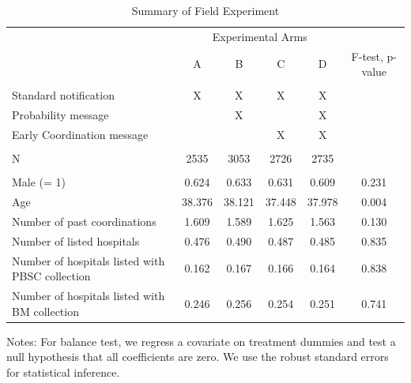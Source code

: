 \documentclass[
]{article}
\begin{document}
\begin{table}

\caption{\label{tab:summary}Summary of Field Experiment}
\centering
\fontsize{9}{11}\selectfont
\begin{threeparttable}
\begin{tabular}[t]{lccccc}
\toprule
\multicolumn{1}{c}{ } & \multicolumn{4}{c}{Experimental Arms} & \multicolumn{1}{c}{ } \\
\cmidrule(l{3pt}r{3pt}){2-5}
 & A & B & C & D & F-test, p-value\\
\midrule
\addlinespace[0.3em]
\multicolumn{6}{l}{\textbf{A. Interventions}}\\
\hspace{1em}Standard notification & X & X & X & X & \\
\hspace{1em}Probability message &  & X &  & X & \\
\hspace{1em}Early Coordination message &  &  & X & X & \\
\addlinespace[0.3em]
\multicolumn{6}{l}{\textbf{B. Sample Size}}\\
\hspace{1em}N & 2535 & 3053 & 2726 & 2735 & \\
\addlinespace[0.3em]
\multicolumn{6}{l}{\textbf{C. Balance Test}}\\
\hspace{1em}Male (= 1) & 0.624 & 0.633 & 0.631 & 0.609 & 0.231\\
\hspace{1em}Age & 38.376 & 38.121 & 37.448 & 37.978 & 0.004\\
\hspace{1em}Number of past coordinations & 1.609 & 1.589 & 1.625 & 1.563 & 0.130\\
\hspace{1em}Number of listed hospitals & 0.476 & 0.490 & 0.487 & 0.485 & 0.835\\
\hspace{1em}Number of hospitals listed with PBSC collection & 0.162 & 0.167 & 0.166 & 0.164 & 0.838\\
\hspace{1em}Number of hospitals listed with BM collection & 0.246 & 0.256 & 0.254 & 0.251 & 0.741\\
\bottomrule
\end{tabular}
\begin{tablenotes}
\item Notes: For balance test, we regress a covariate on treatment dummies and test a null hypothesis that all coefficients are zero. We use the robust standard errors for statistical inference.
\end{tablenotes}
\end{threeparttable}
\end{table}
\end{document}
